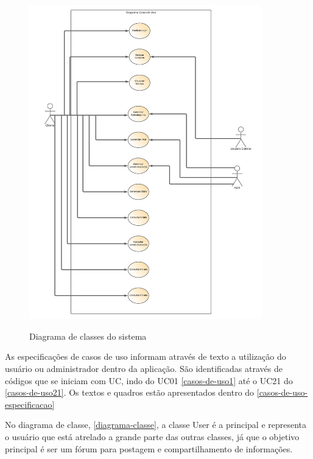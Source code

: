 \pagebreak

\begin{figure}[htb]
	\centering
	\caption{\label{fig_arq_virado}Diagrama de classes do sistema}
	\includegraphics[width=0.90\textwidth]{anexos/Diagrama_em_branco.png}
	\label{diagrama-caso-uso}
\end{figure}



As especificações de casos de uso informam através de texto a utilização do usuário ou administrador dentro da aplicação. São identificadas através de códigos que se iniciam com UC, indo do
UC01 \autoref{casos-de-uso1} até o UC21 do \autoref{casos-de-uso21}. Os textos e quadros estão apresentados dentro do \autoref{casos-de-uso-especificacao}


No diagrama de classe,  \autoref{diagrama-classe}, a classe User é a principal e representa o usuário que está atrelado a grande parte das outras classes, já que o objetivo principal é ser um fórum para postagem e compartilhamento de informações. 

